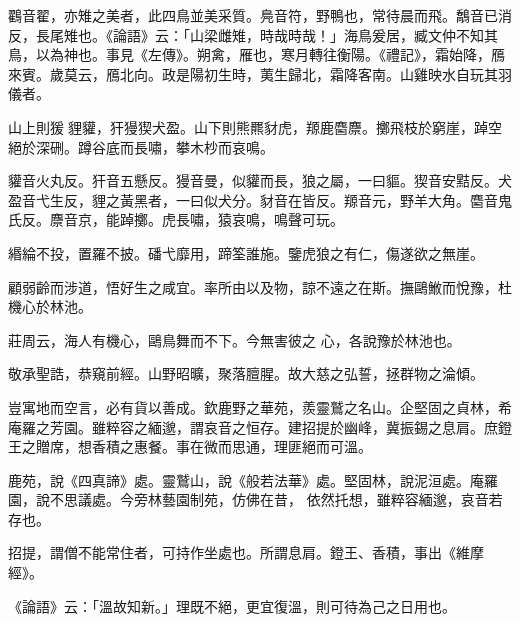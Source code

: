 \begin{pinyinscope}
 鸐音翟，亦雉之美者，此四鳥並美采質。鳧音符，野鴨也，常待晨而飛。鷮音已消反，長尾雉也。《論語》云：「山梁雌雉，時哉時哉！」海鳥爰居，臧文仲不知其鳥，以為神也。事見《左傳》。朔禽，雁也，寒月轉往衡陽。《禮記》，霜始降，鴈來賓。歲莫云，鴈北向。政是陽初生時，荑生歸北，霜降客南。山雞映水自玩其羽儀者。


山上則猨𤟤貍貛，犴獌猰犬盈。山下則熊羆豺虎，羱鹿麕麖。擲飛枝於窮崖，踔空絕於深硎。蹲谷底而長嘯，攀木杪而哀鳴。



 貛音火丸反。犴音五懸反。獌音曼，似貛而長，狼之屬，一曰貙。猰音安黠反。犬盈音弋生反，貍之黃黑者，一曰似犬分。豺音在皆反。羱音元，野羊大角。麕音鬼氏反。麖音京，能踔擲。虎長嘯，猿哀鳴，鳴聲可玩。



 緡綸不投，置羅不披。磻弋靡用，蹄筌誰施。鑒虎狼之有仁，傷遂欲之無崖。


顧弱齡而涉道，悟好生之咸宜。率所由以及物，諒不遠之在斯。撫鷗䱔而悅豫，杜機心於林池。



 莊周云，海人有機心，鷗鳥舞而不下。今無害彼之
 心，各說豫於林池也。



 敬承聖誥，恭窺前經。山野昭曠，聚落膻腥。故大慈之弘誓，拯群物之淪傾。


豈寓地而空言，必有貨以善成。欽鹿野之華苑，羨靈鷲之名山。企堅固之貞林，希庵羅之芳園。雖粹容之緬邈，謂哀音之恒存。建招提於幽峰，冀振錫之息肩。庶鐙王之贈席，想香積之惠餐。事在微而思通，理匪絕而可溫。



 鹿苑，說《四真諦》處。靈鷲山，說《般若法華》處。堅固林，說泥洹處。庵羅園，說不思議處。今旁林藝園制苑，仿佛在昔，
 依然托想，雖粹容緬邈，哀音若存也。



 招提，謂僧不能常住者，可持作坐處也。所謂息肩。鐙王、香積，事出《維摩經》。



 《論語》云：「溫故知新。」理既不絕，更宜復溫，則可待為己之日用也。



\end{pinyinscope}
